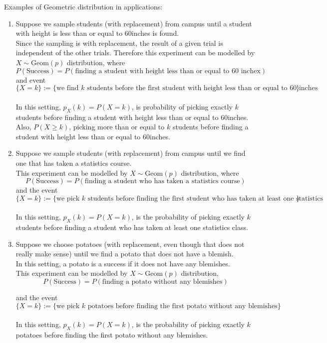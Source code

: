 Examples of Geometric distribution in applications:
\begin{enumerate}
    \item Suppose we sample students (with replacement) from campus until a student with height is less than or equal to 60inches is found. 
    \\
    Since the sampling is with replacement, the result of a given trial is independent of the other trials. Therefore this experiment can be modelled by $X\sim \text{Geom}(p)$ distribution, where $$P(\text{Success}) = P(\text{finding a student with height less than or equal to 60 inchex})$$ 
    and  event
    $$\{X= k \} := \{\text{we find $k$ students before the first student with height less than or equal to 60 inches}\}$$
    \\
    In this setting, $p_X(k) = P(X=k)$, is probability of picking exactly $k$ students before finding a student with height less than or equal to 60inches.  
    \\
    Also, $P(X \ge k)$, picking more than or equal to $k$ students before finding a student with height less than or equal to 60inches.
    \item  Suppose we sample students (with replacement) from campus until we find one that has taken a statistics course. 
    \\
    This experiment can be modelled by $X\sim \text{Geom}(p)$ distribution, 
    where
    $$P(\text{Success}) = P(\text{finding a student who has taken a statistics course})$$
    and the event 
    $$\{X= k \} := \{\text{we pick $k$ students before finding the first student who has taken at least one statistics class}\}$$
    \\
    In this setting, $p_X(k) = P(X=k)$,  is the probability of picking exactly $k$ students before finding a student who has taken at least one statistics class. 
    
    \item  Suppose we choose potatoes (with replacement, even though that does not really make sense) until we find a potato that does not have a blemish. 
    \\
    
    In this setting, a potato is a success if it does not have any blemishes. 
    \\
    This experiment can be modelled by $X\sim \text{Geom}(p)$ distribution, 
    $$P(\text{Success}) = P(\text{finding a potato without any blemishes})$$
    
    and the event 
    $$\{X=k\} := \{\text{we pick $k$ potatoes before finding the first potato without any blemishes}\}$$
    \\
    In this setting, $p_X(k) = P(X=k)$, is the probability of picking exactly $k$  potatoes before finding the first potato without any blemishes. 
\end{enumerate}


